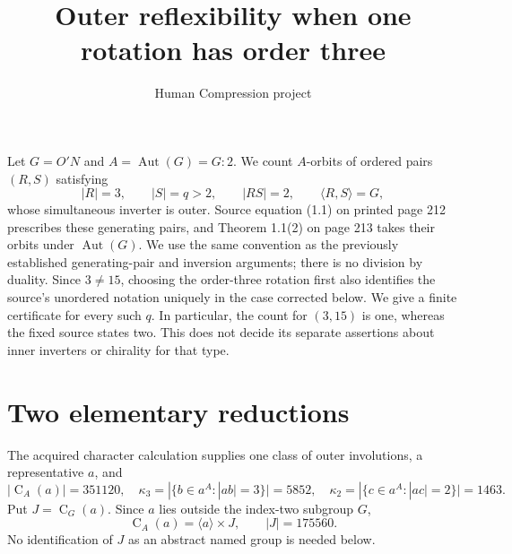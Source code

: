 \documentclass[11pt,a4paper]{article}
\title{Outer reflexibility when one rotation has order three}
\author{Human Compression project}\date{}
\newcommand{\Aut}{\operatorname{Aut}}
\newcommand{\C}{\operatorname{C}}
\begin{document}
\maketitle
Let $G=O'N$ and $A=\Aut(G)=G{:}2$. We count $A$-orbits of ordered
pairs $(R,S)$ satisfying
\[
 |R|=3,\qquad |S|=q>2,\qquad |RS|=2,\qquad\langle R,S\rangle=G,
\]
whose simultaneous inverter is outer. Source equation (1.1) on printed
page 212 prescribes these generating pairs, and Theorem 1.1(2) on
page 213 takes their orbits under $\Aut(G)$. We use the same convention
as the previously established generating-pair and inversion arguments;
there is no division by duality. Since $3\ne15$, choosing the order-three
rotation first also identifies the source's unordered notation uniquely
in the case corrected below. We give a finite certificate for every such $q$.
In particular, the count for $(3,15)$ is one, whereas the fixed source
states two. This does not decide its separate assertions about inner
inverters or chirality for that type.

\section{Two elementary reductions}
The acquired character calculation supplies one class of outer involutions,
a representative $a$, and
\[
 |\C_A(a)|=351120,\quad
 \kappa_3=|\{b\in a^A:|ab|=3\}|=5852,\quad
 \kappa_2=|\{c\in a^A:|ac|=2\}|=1463.
\]
Put $J=\C_G(a)$. Since $a$ lies outside the index-two subgroup $G$,
\[
 \C_A(a)=\langle a\rangle\times J,\qquad |J|=175560.
\]
No identification of $J$ as an abstract named group is needed below.
\end{document}

